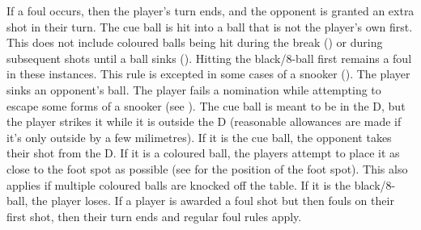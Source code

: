  If a foul occurs, then the player's turn ends, and the opponent is granted an extra shot in their turn.%
 {}%
 \FoulCircumstances%
\subruleitem The cue ball is hit into a ball that is not the player's own first. This does not include coloured balls being hit during the break () or during subsequent shots until a ball sinks (). Hitting the black/8-ball first remains a foul in these instances. This rule is excepted in some cases of a snooker ().%
\subruleitem \CueBallMiss%
\subruleitem \CueBallSink%
\subruleitem The player sinks an opponent's ball.%
\subruleitem \CueBallRail%
\subruleitem \CueBallPreemptive%
\subruleitem The player fails a nomination while attempting to escape some forms of a snooker (see ).%
\subruleitem The cue ball is meant to be in the D, but the player strikes it while it is outside the D (reasonable allowances are made if it's only outside by a few milimetres).%
\subruleitem \PushShot%
\subruleitem {}%
\BallOffTable%
\subsubruleitem If it is the cue ball, the opponent takes their shot from the D.%
\subsubruleitem If it is a coloured ball, the players attempt to place it as close to the foot spot as possible (see  for the position of the foot spot). This also applies if multiple coloured balls are knocked off the table.%
\subsubruleitem If it is the black/8-ball, the player loses.%
\subruleitem \JumpShot%
\subruleitem \TableMovement%
\subruleitem {}%
 If a player is awarded a foul shot but then fouls on their first shot, then their turn ends and regular foul rules apply.%
%


